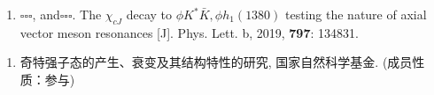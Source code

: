 \thispagestyle{empty}
\fontsize{12pt}{13pt}\selectfont
{}
\begin{enumerate}
\item {\textbf{$\square\square\square$}}, and$\square\square\square$.
	The $\chi_{cJ}$ decay to $\phi K^* \bar K, \phi h_1(1380)$ testing the nature of axial vector meson resonances [J].
	{Phys. Lett. b, 2019, \textbf{797}: 134831.}
\end{enumerate}
\vspace{2cm}\par
\begin{enumerate}
	\item 奇特强子态的产生、衰变及其结构特性的研究, 国家自然科学基金. (成员性质：参与)
\end{enumerate}\par
